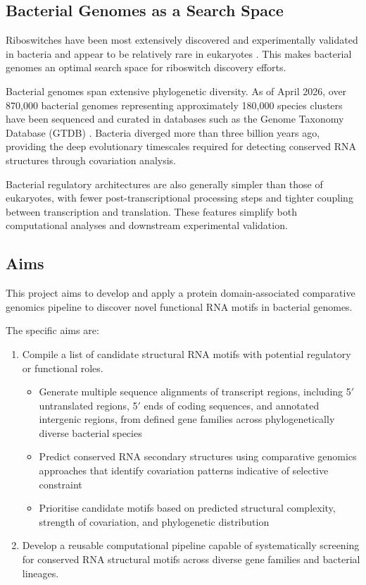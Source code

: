 \documentclass{article}
\begin{document}
\subsection{Bacterial Genomes as a Search Space}

Riboswitches have been most extensively discovered and experimentally validated in bacteria and appear to be relatively rare in eukaryotes \parencite{Kavita2023}.
This makes bacterial genomes an optimal search space for riboswitch discovery efforts.

Bacterial genomes span extensive phylogenetic diversity.
As of April 2026, over 870,000 bacterial genomes representing approximately 180,000 species clusters have been sequenced and curated in databases such as the Genome Taxonomy Database (GTDB) \parencite{GTDB2026}.
Bacteria diverged more than three billion years ago, providing the deep evolutionary timescales required for detecting conserved RNA structures through covariation analysis.

Bacterial regulatory architectures are also generally simpler than those of eukaryotes, with fewer post-transcriptional processing steps and tighter coupling between transcription and translation.
These features simplify both computational analyses and downstream experimental validation.

\subsection{Aims}

This project aims to develop and apply a protein domain-associated comparative genomics pipeline to discover novel functional RNA motifs in bacterial genomes.

The specific aims are:

\begin{enumerate}
    \item Compile a list of candidate structural RNA motifs with potential regulatory or functional roles.
    \begin{itemize}
        \item Generate multiple sequence alignments of transcript regions, including 5$'$ untranslated regions, 5$'$ ends of coding sequences, and annotated intergenic regions, from defined gene families across phylogenetically diverse bacterial species
        \item Predict conserved RNA secondary structures using comparative genomics approaches that identify covariation patterns indicative of selective constraint
        \item Prioritise candidate motifs based on predicted structural complexity, strength of covariation, and phylogenetic distribution
    \end{itemize}

    \item Develop a reusable computational pipeline capable of systematically screening for conserved RNA structural motifs across diverse gene families and bacterial lineages.
\end{enumerate}
\end{document}
